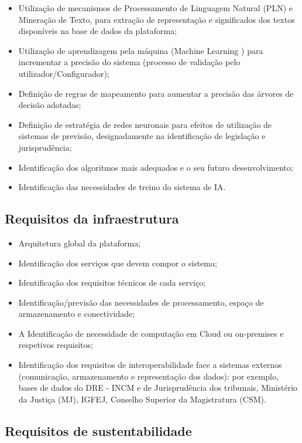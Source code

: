 \begin{itemize}
\item Utilização de mecanismos de Processamento de Linguagem Natural (PLN) e Mineração de
Texto, para extração de representação e significados dos textos disponíveis na base de dados
da plataforma;
\item Utilização de aprendizagem pela máquina (Machine Learning ) para incrementar a precisão do
sistema (processo de validação pelo utilizador/Configurador);
\item Definição de regras de mapeamento para aumentar a precisão das árvores de decisão
adotadas;
\item Definição de estratégia de redes neuronais para efeitos de utilização de sistemas de previsão,
designadamente na identificação de legislação e jurisprudência;
\item Identificação dos algoritmos mais adequados e o seu futuro desenvolvimento;
\item Identificação das necessidades de treino do sistema de IA.
\end{itemize}


\subsection{Requisitos da infraestrutura}

\begin{itemize}
\item Arquitetura global da plataforma;
\item Identificação dos serviços que devem compor o sistema;
\item Identificação dos requisitos técnicos de cada serviço;
\item Identificação/previsão das necessidades de processamento, espaço de armazenamento e
conectividade;
\item A Identificação de necessidade de computação em Cloud ou on-premises e respetivos
requisitos;
\item Identificação dos requisitos de interoperabilidade face a sistemas externos (comunicação,
armazenamento e representação dos dados): por exemplo, bases de dados do DRE - INCM e
de Jurisprudência dos tribunais, Ministério da Justiça (MJ), IGFEJ, 
Conselho Superior da Magistratura (CSM).
\end{itemize}


\subsection{Requisitos de sustentabilidade}



